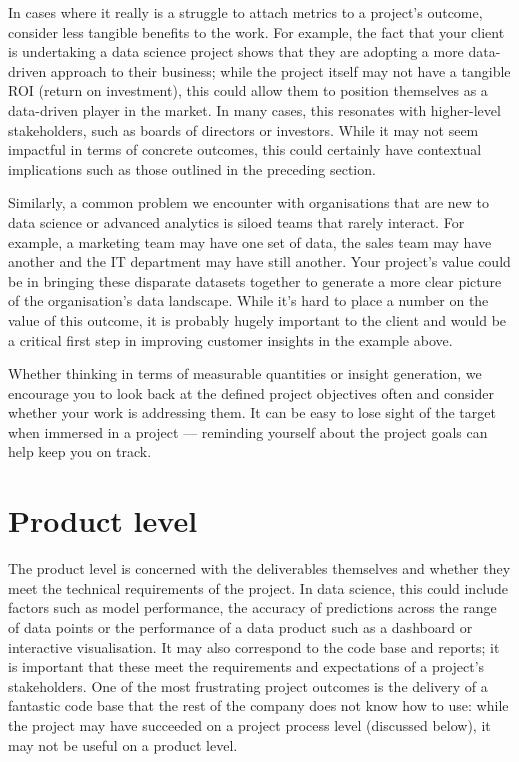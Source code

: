 \documentclass[
]{book}
\begin{document}
In cases where it really is a struggle to attach metrics to a project's
outcome, consider less tangible benefits to the work. For example, the
fact that your client is undertaking a data science project shows that
they are adopting a more data-driven approach to their business; while
the project itself may not have a tangible ROI (return on investment),
this could allow them to position themselves as a data-driven player in
the market. In many cases, this resonates with higher-level
stakeholders, such as boards of directors or investors. While it may not
seem impactful in terms of concrete outcomes, this could certainly have
contextual implications such as those outlined in the preceding section.

Similarly, a common problem we encounter with organisations that are new
to data science or advanced analytics is siloed teams that rarely
interact. For example, a marketing team may have one set of data, the
sales team may have another and the IT department may have still
another. Your project's value could be in bringing these disparate
datasets together to generate a more clear picture of the organisation's
data landscape. While it's hard to place a number on the value of this
outcome, it is probably hugely important to the client and would be a
critical first step in improving customer insights in the example above.

Whether thinking in terms of measurable quantities or insight
generation, we encourage you to look back at the defined project
objectives often and consider whether your work is addressing them. It
can be easy to lose sight of the target when immersed in a project ---
reminding yourself about the project goals can help keep you on track.

\hypertarget{product-level}{%
\section{Product level}\label{product-level}}

The product level is concerned with the deliverables themselves and
whether they meet the technical requirements of the project. In data
science, this could include factors such as model performance, the
accuracy of predictions across the range of data points or the
performance of a data product such as a dashboard or interactive
visualisation. It may also correspond to the code base and reports; it
is important that these meet the requirements and expectations of a
project's stakeholders. One of the most frustrating project outcomes is
the delivery of a fantastic code base that the rest of the company does
not know how to use: while the project may have succeeded on a project
process level (discussed below), it may not be useful on a product
level.
\end{document}
